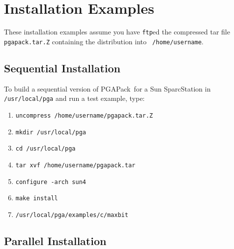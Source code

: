 \documentclass{report}
\newcommand{\pga}{PGAPack}
\begin{document}
\section{Installation Examples}\label{sec:install-examples}

These installation examples assume you have {\tt ftp}ed the compressed tar
file {\tt pgapack.tar.Z} containing the distribution into {\tt
/home/username}.

\subsection{Sequential Installation}\label{subsec:seq-install}

To build a sequential version of \pga\ for a Sun SparcStation in {\tt
/usr/local/pga} and run a test example, type:
\begin{enumerate}
\item {\tt uncompress /home/username/pgapack.tar.Z}
\item {\tt mkdir /usr/local/pga}
\item {\tt cd /usr/local/pga}
\item {\tt tar xvf /home/username/pgapack.tar}
\item {\tt configure -arch sun4}
\item {\tt make install}
\item {\tt /usr/local/pga/examples/c/maxbit}
\end{enumerate}

\subsection{Parallel Installation}\label{subsec:par-install}
\end{document}
